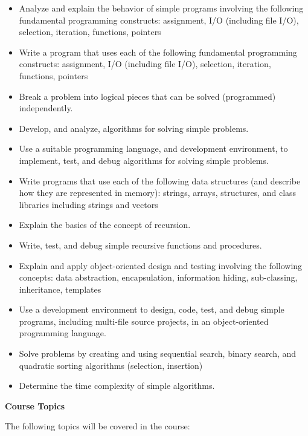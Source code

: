 \documentclass[12pt]{article}
\begin{document}
\begin{itemize}
\item Analyze and explain the behavior of simple programs involving the following fundamental programming constructs: assignment, I/O (including file I/O), selection, iteration, functions, pointers
\item Write a program that uses each of the following fundamental programming constructs: assignment, I/O (including file I/O), selection, iteration, functions, pointers
\item Break a problem into logical pieces that can be solved (programmed) independently.
\item Develop, and analyze, algorithms for solving simple problems.
\item Use a suitable programming language, and development environment, to implement, test, and debug algorithms for solving simple problems.
\item Write programs that use each of the following data structures (and describe how they are represented in memory): strings, arrays, structures, and class libraries including strings and vectors
\item Explain the basics of the concept of recursion.
\item Write, test, and debug simple recursive functions and procedures.
\item Explain and apply object-oriented design and testing involving the following concepts: data abstraction, encapsulation, information hiding, sub-classing, inheritance, templates
\item Use a development environment to design, code, test, and debug simple programs, including multi-file source projects, in an object-oriented programming language.
\item Solve problems by creating and using sequential search, binary search, and quadratic sorting algorithms (selection, insertion)
\item Determine the time complexity of simple algorithms.
\end{itemize}

\pagebreak
{\large \noindent \textbf{Course Topics} }

\noindent The following topics will be covered in the course:
\end{document}
